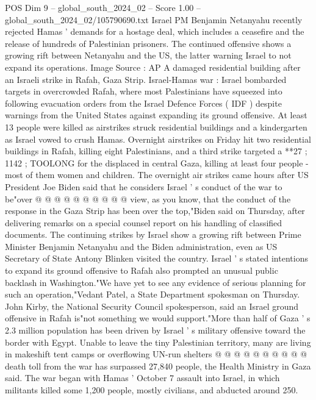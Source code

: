 \begin{textsample}{POS Dim 9 – global\_south\_2024\_02 – Score 1.00 – global\_south\_2024\_02/105790690.txt}  \label{ex:f9_pos_100}
Israel PM Benjamin Netanyahu recently rejected Hamas ' demands for a hostage deal, which includes a ceasefire and the release of hundreds of Palestinian prisoners.
The continued offensive shows a growing rift between Netanyahu and the US, the latter warning Israel to not expand its operations.
Image Source : AP A damaged residential building after an Israeli strike in Rafah, Gaza Strip.
Israel-Hamas war : Israel bombarded targets in overcrowded Rafah, where most Palestinians have squeezed into following evacuation orders from the Israel Defence Forces ( IDF ) despite warnings from the United States against expanding its ground offensive.
At least 13 people were killed as airstrikes struck residential buildings and a kindergarten as Israel vowed to crush Hamas.
Overnight airstrikes on Friday hit two residential buildings in Rafah, killing eight Palestinians, and a third strike targeted a **27 ; 1142 ; TOOLONG for the displaced in central Gaza, killing at least four people - most of them women and children.
The overnight air strikes came hours after US President Joe Biden said that he considers Israel ' s conduct of the war to be"over @ @ @ @ @ @ @ @ @ @ view, as you know, that the conduct of the response in the Gaza Strip has been over the top,"Biden said on Thursday, after delivering remarks on a special counsel report on his handling of classified documents.
The continuing strikes by Israel show a growing rift between Prime Minister Benjamin Netanyahu and the Biden administration, even as US Secretary of State Antony Blinken visited the country.
Israel ' s stated intentions to expand its ground offensive to Rafah also prompted an unusual public backlash in Washington."We have yet to see any evidence of serious planning for such an operation,"Vedant Patel, a State Department spokesman on Thursday.
John Kirby, the National Security Council spokesperson, said an Israel ground offensive in Rafah is"not something we would support."More than half of Gaza ' s 2.3 million population has been driven by Israel ' s military offensive toward the border with Egypt.
Unable to leave the tiny Palestinian territory, many are living in makeshift tent camps or overflowing UN-run shelters @ @ @ @ @ @ @ @ @ @ death toll from the war has surpassed 27,840 people, the Health Ministry in Gaza said.
The war began with Hamas ' October 7 assault into Israel, in which militants killed some 1,200 people, mostly civilians, and abducted around 250.

\end{textsample}
